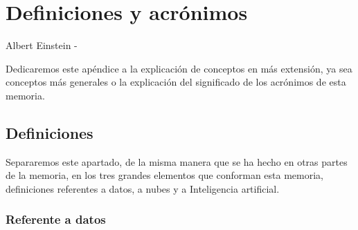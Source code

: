 \chapter{Definiciones y acrónimos}
\label{Appendix:1}

 {Albert Einstein}
-

Dedicaremos este apéndice a la explicación de conceptos en más extensión, ya sea conceptos más generales o la explicación del significado de los acrónimos de esta memoria.

\section{Definiciones}

Separaremos este apartado, de la misma manera que se ha hecho en otras partes de la memoria, en los tres grandes elementos que conforman esta memoria, definiciones referentes a datos, a nubes y a Inteligencia artificial.

\subsection{Referente a datos}

